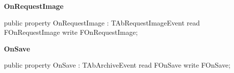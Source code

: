 \documentclass{report}
\newif\ifpdf
\begin{document}
\begin{list}{}
\par  \label{AbArcTyp.TAbArchive-OnRequestImage}
\item[\textbf{OnRequestImage}\hfill]
\ifpdf
\begin{flushleft}
\fi
\begin{ttfamily}
public property OnRequestImage : TAbRequestImageEvent
      read FOnRequestImage
      write FOnRequestImage;\end{ttfamily}

\ifpdf
\end{flushleft}
\fi


\par  \label{AbArcTyp.TAbArchive-OnSave}
\item[\textbf{OnSave}\hfill]
\ifpdf
\begin{flushleft}
\fi
\begin{ttfamily}
public property OnSave : TAbArchiveEvent
      read FOnSave
      write FOnSave;\end{ttfamily}

\ifpdf
\end{flushleft}
\fi


\par  \end{list}
\end{document}
